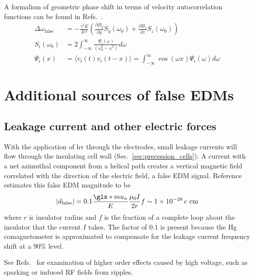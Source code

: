 A formalism of geometric phase shift in terms of velocity autocorrelation functions can be found in Refs.~\cite{lamoreaux_geometric_phase_2005, barabanov_geometric_phase_2006, swank_geometric_phase_2009}.
%
\begin{align}
    \Delta\omega_\text{false} &= -\frac{\gamma^2 E}{2c^2}\left( \frac{\partial B_y}{\partial y} S_y(\omega_0) + \frac{\partial B_z}{\partial z} S_z(\omega_0) \right) \\
    S_i(\omega_0) &= 2\int_{-\infty}^{\infty} \frac{\Psi_i(\omega)}{(\omega_0^2 - \omega^2)}d\omega \\
    \Psi_i(x) &= \langle v_i(t)v_i(t-x) \rangle = \int_{-\infty}^{\infty}\cos (\omega x) \Psi_i (\omega) d\omega
\end{align}



\section{Additional sources of false EDMs}


\subsection*{Leakage current and other electric forces}

With the application of \acrshort{hv} through the electrodes, small leakage currents will flow through the insulating cell wall (Sec.~\ref{sec:precession_cells}). A current with a net azimuthal component from a helical path creates a vertical magnetic field correlated with the direction of the electric field, a false EDM signal. Reference~\cite{baker_apparatus_2014} estimates this false EDM magnitude to be
%
\begin{gather}
    | d_\text{false} | = 0.1\frac{\gls*{mu_n}}{E}\frac{\mu_0 I}{2r}f \sim \num{1e-28}\,e\text{ cm}
\end{gather}
%
where $r$ is insulator radius and $f$ is the fraction of a complete loop about the insulator that the current $I$ takes. The factor of $0.1$ is present because the Hg comagnetometer is approximated to compensate for the leakage current frequency shift at a 90\% level.

See Refs.~\cite{baker_apparatus_2014, pendlebury_revised_2015} for examination of higher order effects caused by high voltage, such as sparking or induced RF fields from ripples.

